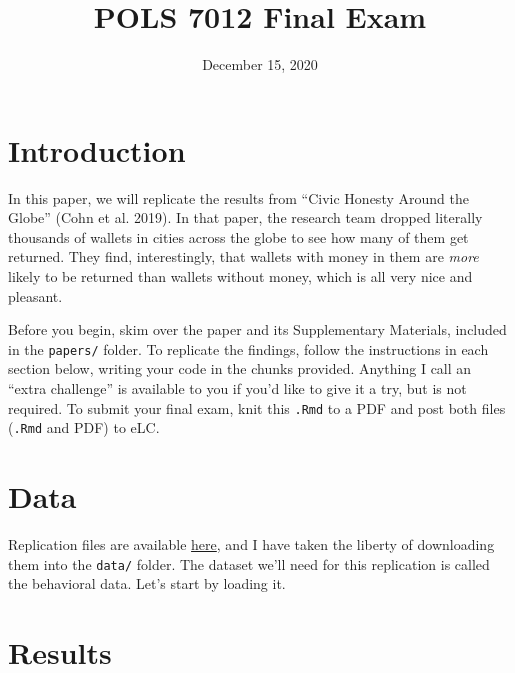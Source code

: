 \documentclass[12pt,halfline,a4paper,]{ouparticle}
\begin{document}
\title{POLS 7012 Final Exam}

\author{%
\address{University of
Georgia}
\and
{}\address{University of
Georgia}
}

\abstract{}

\date{December 15, 2020}

\keywords{}

\maketitle



\hypertarget{introduction}{%
\section{Introduction}\label{introduction}}

In this paper, we will replicate the results from ``Civic Honesty Around
the Globe'' (Cohn et al. 2019). In that paper, the research team dropped
literally thousands of wallets in cities across the globe to see how
many of them get returned. They find, interestingly, that wallets with
money in them are \emph{more} likely to be returned than wallets without
money, which is all very nice and pleasant.

Before you begin, skim over the paper and its Supplementary Materials,
included in the \texttt{papers/} folder. To replicate the findings,
follow the instructions in each section below, writing your code in the
chunks provided. Anything I call an ``extra challenge'' is available to
you if you'd like to give it a try, but is not required. To submit your
final exam, knit this \texttt{.Rmd} to a PDF and post both files
(\texttt{.Rmd} and PDF) to eLC.

\hypertarget{data}{%
\section{Data}\label{data}}

Replication files are available
\href{https://dataverse.harvard.edu/dataverse/honesty}{here}, and I have
taken the liberty of downloading them into the \texttt{data/} folder.
The dataset we'll need for this replication is called the behavioral
data. Let's start by loading it.

\hypertarget{results}{%
\section{Results}\label{results}}
\end{document}
